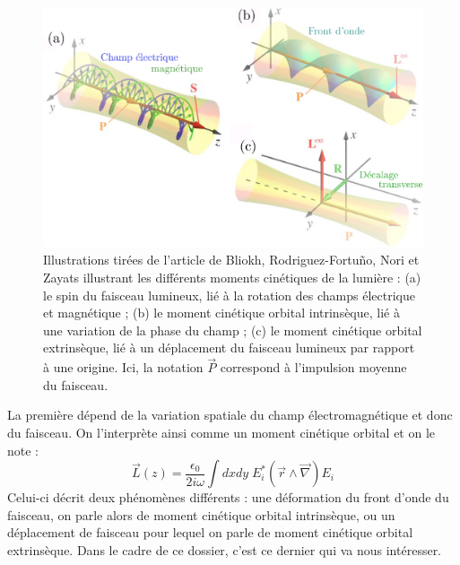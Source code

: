 \documentclass[a4paper,11pt]{article} %
\begin{document}
	\begin{figure}[h]
		\centering
		\begin{minipage}[c]{0.85\linewidth}
			\centering
			\includegraphics[width=0.9\linewidth]{./Illustrations/moments_angulaires}
			\caption{Illustrations tirées de l'article de Bliokh, Rodriguez-Fortuño, Nori et Zayats illustrant les différents moments cinétiques de la lumière : (a) le spin du faisceau lumineux, lié à la rotation des champs électrique et magnétique ; (b) le moment cinétique orbital intrinsèque, lié à une variation de la phase du champ ; (c) le moment cinétique orbital extrinsèque, lié à un déplacement du faisceau lumineux par rapport à une origine. Ici, la notation $ \vec{P} $ correspond à l'impulsion moyenne du faisceau.}
			\label{fig:moments_angulaires}
		\end{minipage}
	\end{figure}
	
	La première dépend de la variation spatiale du champ électromagnétique et donc du faisceau. On l'interprète ainsi comme un moment cinétique orbital et on le note :
	\begin{equation*}
		\vec{L}(z) = \frac{\epsilon_0}{2 i \omega} \int \! dx dy \; E_i^* (\vec{r} \wedge \vec{\nabla} ) E_i
	\end{equation*}
	Celui-ci décrit deux phénomènes différents : une déformation du front d'onde du faisceau, on parle alors de moment cinétique orbital intrinsèque, ou un déplacement de faisceau pour lequel on parle de moment cinétique orbital extrinsèque. Dans le cadre de ce dossier, c'est ce dernier qui va nous intéresser.\\
	
\end{document}

